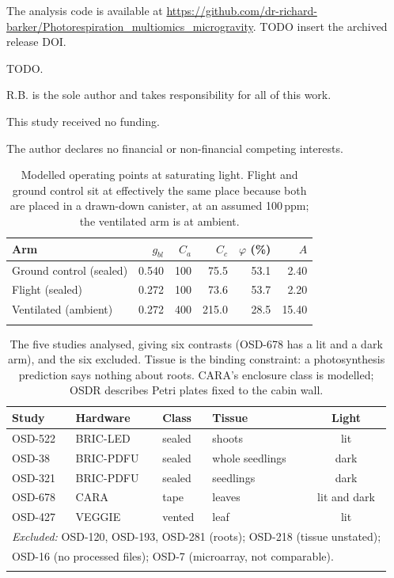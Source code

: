 \documentclass[pdflatex,sn-nature]{sn-jnl}
\begin{document}
The analysis code is available at
\url{https://github.com/dr-richard-barker/Photorespiration_multiomics_microgravity}.
TODO insert the archived release DOI.

TODO.

R.B. is the sole author and takes responsibility for all of this work.

This study received no funding.

The author declares no financial or non-financial competing interests.

\begin{table}[t]
\caption{Modelled operating points at saturating light. Flight and ground control sit at
effectively the same place because both are placed in a drawn-down canister, at an assumed
100\,ppm; the ventilated arm is at ambient.}
\label{tab:operating}
\begin{tabular}{lrrrrr}
\toprule
Arm & $g_{bl}$ & $C_a$ & $C_c$ & $\varphi$ (\%) & $A$ \\
\midrule
Ground control (sealed)   & 0.540 & 100 & 75.5  & 53.1 & 2.40 \\
Flight (sealed)           & 0.272 & 100 & 73.6  & 53.7 & 2.20 \\
Ventilated (ambient)      & 0.272 & 400 & 215.0 & 28.5 & 15.40 \\
\botrule
\end{tabular}
\end{table}

\begin{table}[t]
\caption{The five studies analysed, giving six contrasts (OSD-678 has a lit and a dark arm),
and the six excluded. Tissue is the binding constraint: a photosynthesis prediction says
nothing about roots. CARA's enclosure class is modelled; OSDR describes Petri plates fixed to
the cabin wall.}
\label{tab:studies}
\begin{tabular}{llllc}
\toprule
Study & Hardware & Class & Tissue & Light \\
\midrule
OSD-522 & BRIC-LED       & sealed & shoots          & lit \\
OSD-38  & BRIC-PDFU      & sealed & whole seedlings & dark \\
OSD-321 & BRIC-PDFU      & sealed & seedlings       & dark \\
OSD-678 & CARA           & tape   & leaves          & lit and dark \\
OSD-427 & VEGGIE         & vented & leaf            & lit \\
\midrule
\multicolumn{5}{l}{\textit{Excluded:} OSD-120, OSD-193, OSD-281 (roots);
OSD-218 (tissue unstated);} \\
\multicolumn{5}{l}{OSD-16 (no processed files); OSD-7 (microarray, not comparable).} \\
\botrule
\end{tabular}
\end{table}
\end{document}
